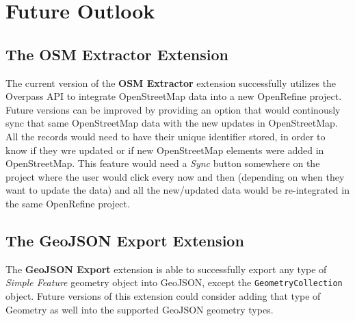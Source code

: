 \section*{Future Outlook}
\subsection*{The OSM Extractor Extension}
The current version of the \textbf{OSM Extractor} extension successfully utilizes the Overpass API to integrate OpenStreetMap
data into a new OpenRefine project. Future versions can be improved by providing an option that would continously sync that same OpenStreetMap data
with the new updates in OpenStreetMap. All the records would need to have their unique identifier stored, in order to know if they wre updated or if new
OpenStreetMap elements were added in OpenStreetMap. This feature would need a \textit{Sync} button somewhere on the project
where the user would click every now and then (depending on when they want to update the data) and all the new/updated data would be re-integrated in the same OpenRefine project.
\subsection*{The GeoJSON Export Extension}
The \textbf{GeoJSON Export} extension is able to successfully export any type of \textit{Simple Feature} geometry object into GeoJSON, except the \texttt{GeometryCollection} object.
Future versions of this extension could consider adding that type of Geometry as well into the supported GeoJSON geometry types.